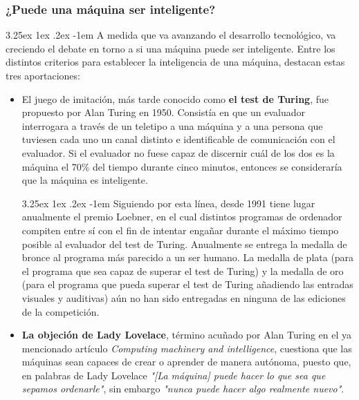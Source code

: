 \documentclass{article}
\makeatletter
\newcommand{\comment}[1]{}
\renewcommand\paragraph{\@startsection{paragraph}{5}{\z@}%
      {3.25ex \@plus1ex \@minus.2ex}%
      {-1em}%
      {\normalfont\normalsize\bfseries}}
\makeatother
\begin{document}
            \subsubsection{¿Puede una máquina ser inteligente?}
    
    \paragraph{}
    A medida que va avanzando el desarrollo tecnológico, va creciendo el debate en torno a si una máquina puede ser inteligente. \comment{Ponerlo menos difuso, citar fuentes del debate etc}Entre los distintos criterios para establecer la inteligencia de una máquina, destacan estas tres aportaciones:
    \begin{itemize}
        \item El juego de imitación, más tarde conocido como \textbf{el test de Turing}, fue propuesto por Alan Turing en 1950\cite{testTuring}. Consistía en que un evaluador interrogara a través de un teletipo a una máquina y a una persona que tuviesen cada uno un canal distinto e identificable de comunicación con el evaluador. Si el evaluador no fuese capaz de discernir cuál de los dos es la máquina el 70\% del tiempo durante cinco minutos, entonces se consideraría que la máquina es inteligente.
        
        \paragraph{}
        Siguiendo por esta línea, desde 1991 tiene lugar anualmente el premio Loebner, \cite{premioLoebner} en el cual distintos programas de ordenador compiten entre sí con el fin de intentar engañar durante el máximo tiempo posible al evaluador del test de Turing. Anualmente se entrega la medalla de bronce al programa más parecido a un ser humano. La medalla de plata (para el programa que sea capaz de superar el test de Turing) y la medalla de oro (para el programa que pueda superar el test de Turing añadiendo las entradas visuales y auditivas) aún no han sido entregadas en ninguna de las ediciones de la competición.\comment{Añadir más citas, concretar más}
        
        \item \textbf{La objeción de Lady Lovelace}, término acuñado por Alan Turing en el ya mencionado artículo \textit{Computing machinery and intelligence}\comment{Vuelvo a referenciar al artículo citado?}, cuestiona que las máquinas sean capaces de crear o aprender de manera autónoma, puesto que, en palabras de Lady Lovelace \textit{"[La máquina] puede hacer lo que sea que sepamos ordenarle"}, sin embargo \textit{"nunca puede hacer algo realmente nuevo"}\cite{artLadyLovelace}.
        

\end{itemize}
\end{document}
